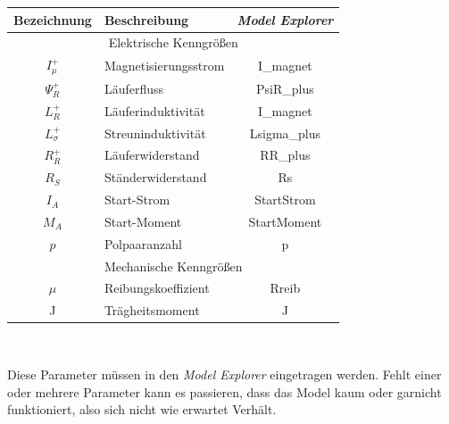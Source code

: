 	\begin{tabular}{c|l|c}
	Bezeichnung & Beschreibung & \textit{Model Explorer} \\ \hline
	\multicolumn{3}{c}{Elektrische Kenngrößen}\\ \hline
	\begin{math} I_{\mu}^{+} \end{math} & Magnetisierungsstrom & I\_magnet\\
	\begin{math} \Psi_{R}^{+} \end{math} & Läuferfluss & PsiR\_plus\\
	\begin{math} L_{R}^{+} \end{math} & Läuferinduktivität & I\_magnet\\
	\begin{math} L_{\sigma}^{+} \end{math} & Streuninduktivität & Lsigma\_plus\\
	\begin{math} R_{R}^{+} \end{math} & Läuferwiderstand & RR\_plus\\
	\begin{math} R_{S} \end{math} & Ständerwiderstand & Rs\\
	\begin{math} I_{A} \end{math} & Start-Strom & StartStrom\\
	\begin{math} M_{A} \end{math} & Start-Moment & StartMoment\\
	\begin{math} p \end{math} & Polpaaranzahl & p\\
	\multicolumn{3}{c}{Mechanische Kenngrößen}\\ \hline
	\begin{math} \mu \end{math} & Reibungskoeffizient & Rreib\\
	J & Trägheitsmoment & J\\
	\end{tabular}\\\par
	
Diese Parameter müssen in den \textit{Model Explorer} eingetragen werden. Fehlt einer oder mehrere Parameter kann es passieren, dass das Model kaum oder garnicht funktioniert, also sich nicht wie erwartet Verhält.\\\par
	
